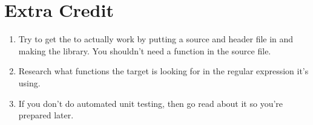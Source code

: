 \section{Extra Credit}

\begin{enumerate}
\item Try to get the  to actually work by putting a source
    and header file in  and making the library.  You shouldn't
    need a  function in the source file.
\item Research what functions the  target is looking for in the
     regular expression it's using.
\item If you don't do automated unit testing, then go read about it so you're
    prepared later.
\end{enumerate}


